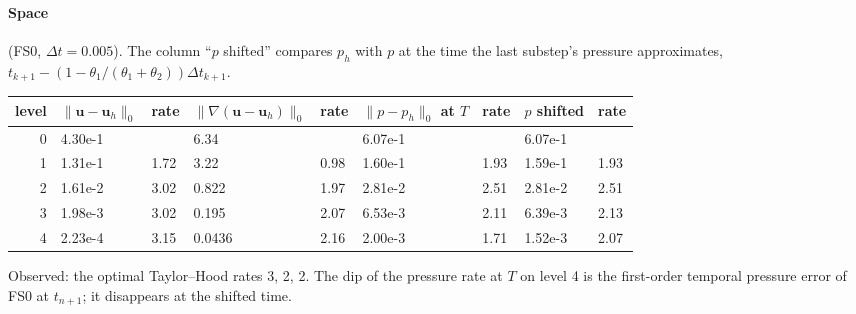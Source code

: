\documentclass[11pt,a4paper]{article}
\newcommand{\bu}{\boldsymbol{u}}
\newcommand{\dt}{\Delta t}
\begin{document}
\paragraph{Space} (FS0, $\dt=0.005$). The column ``$p$ shifted'' compares $p_h$ with $p$ at the time the last
substep's pressure approximates, $t_{k+1}-(1-\theta_1/(\theta_1+\theta_2))\dt_{k+1}$.
\begin{center}\begin{adjustbox}{max width=\textwidth}
\begin{tabular}{rllllllll}
\toprule
level & $\|\bu-\bu_h\|_0$ & rate & $\|\nabla(\bu-\bu_h)\|_0$ & rate & $\|p-p_h\|_0$ at $T$ & rate & $p$ shifted & rate\\
\midrule
0 & 4.30e-1 & & 6.34 & & 6.07e-1 & & 6.07e-1 &\\
1 & 1.31e-1 & 1.72 & 3.22 & 0.98 & 1.60e-1 & 1.93 & 1.59e-1 & 1.93\\
2 & 1.61e-2 & 3.02 & 0.822 & 1.97 & 2.81e-2 & 2.51 & 2.81e-2 & 2.51\\
3 & 1.98e-3 & 3.02 & 0.195 & 2.07 & 6.53e-3 & 2.11 & 6.39e-3 & 2.13\\
4 & 2.23e-4 & 3.15 & 0.0436 & 2.16 & 2.00e-3 & 1.71 & 1.52e-3 & 2.07\\
\bottomrule
\end{tabular}
\end{adjustbox}\end{center}
Observed: the optimal Taylor--Hood rates 3, 2, 2. The dip of the pressure rate at $T$ on level 4 is the first-order
temporal pressure error of FS0 at $t_{n+1}$; it disappears at the shifted time.
\end{document}
